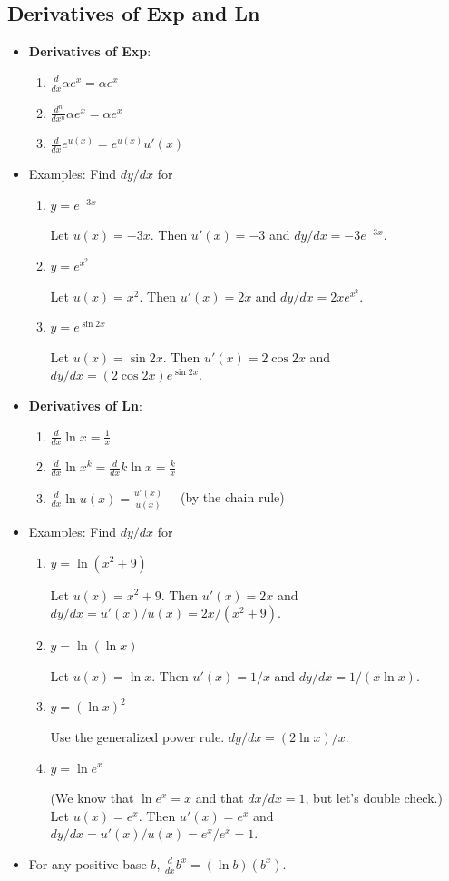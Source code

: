 \documentclass[11pt]{article}
\newcommand{\bi}{\begin{itemize}}
\newcommand{\ei}{\end{itemize}}
\newcommand{\be}{\begin{enumerate}}
\newcommand{\ee}{\end{enumerate}}
\newcommand{\pbof}{\parbox[t]{1.5in}}
\newcommand{\pbff}{\parbox[t]{4in}}
\begin{document}
\subsection{Derivatives of Exp and Ln}
\bi
\item {\bf Derivatives of Exp}:
  \be
  \item $\frac{d}{dx}\alpha e^x = \alpha e^x$
  \item $\frac{d^n}{dx^n} \alpha e^x = \alpha e^x$
  \item $\frac{d}{dx}e^{u(x)}= e^{u(x)} u'(x)$
  \ee

\item Examples:  Find $dy/dx$ for
  \be
  \item \pbof{$y=e^{-3x}$}\pbff{Let $u(x)=-3x$.  Then $u'(x)=-3$
and $dy/dx=-3e^{-3x}$.}
  \item \pbof{$y=e^{x^2}$}\pbff{Let $u(x)=x^2$.  Then $u'(x)=2x$
and $dy/dx=2xe^{x^2}$.}
  \item \pbof{$y=e^{\sin 2x}$}\pbff{Let $u(x)=\sin 2x$.  Then
$u'(x)=2\cos 2x$ and $dy/dx=(2\cos 2x) e^{\sin 2x}$.}
  \ee

\item {\bf Derivatives of Ln}:
  \be
  \item $\frac{d}{dx} \ln x = \frac{1}{x}$
  \item $\frac{d}{dx} \ln x^k = \frac{d}{dx} k \ln x = \frac{k}{x}$
  \item $\frac{d}{dx} \ln u(x) = \frac{u'(x)}{u(x)}\quad$  (by the chain rule)
  \ee

\item Examples:  Find $dy/dx$ for
  \be
  \item \pbof{$y=\ln(x^2+9)$}\pbff{Let $u(x)=x^2+9$.  Then
$u'(x)=2x$ and $dy/dx=u'(x)/u(x)=2x/(x^2+9)$.}
  \item \pbof{$y=\ln(\ln x)$}\pbff{Let $u(x)=\ln x$.  Then
$u'(x)=1/x$ and $dy/dx=1/(x\ln x)$.}
  \item \pbof{$y=(\ln x)^2$}\pbff{Use the generalized power rule.
 $dy/dx=(2\ln x)/x$.}
  \item \pbof{$y=\ln e^x$}\pbff{(We know that $\ln e^x=x$ and
that $dx/dx=1$, but let's double check.)  Let $u(x)=e^x$.  Then
$u'(x)=e^x$ and $dy/dx=u'(x)/u(x)=e^x/e^x=1$.}
  \ee

\item For any positive base $b$, $\frac{d}{dx} b^x = (\ln
b)\left(b^x\right)$.

\ei
\end{document}
